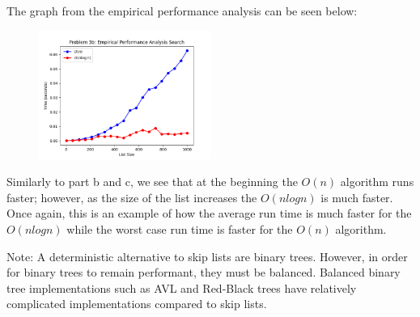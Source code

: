 \documentclass{hw}
\begin{document}
\begin{problem}
\begin{solution}
        The graph from the empirical performance analysis can be seen below:
\begin{figure}[ht]
  \centering
      \includegraphics[width=0.5\textwidth]{figures/problem-3d.png}
\end{figure}

Similarly to part b and c, we see that at the beginning the $O(n)$ algorithm runs faster; however, as the size of the list increases the $O(nlogn)$ is much faster. Once again, this is an example of how the average run time is much faster for the $O(nlogn)$ while the worst case run time is faster for the $O(n)$ algorithm.
\end{solution}


Note: A deterministic alternative to skip lists are binary trees.
However, in order for binary trees to remain performant,
they must be balanced. Balanced binary tree implementations such as
AVL and Red-Black trees have relatively complicated implementations compared to skip lists.

\end{problem}
\newpage

 
\end{document}
